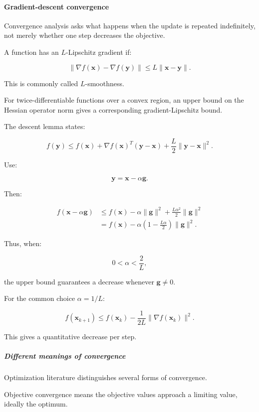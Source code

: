 \paragraph{Gradient-descent convergence}\label{gradient-descent-convergence}

Convergence analysis asks what happens when the update is repeated indefinitely, not merely whether one step decreases the objective.

A function has an \(L\)-Lipschitz gradient if:

\[
\|\nabla f(\mathbf x)-\nabla f(\mathbf y)\| \le L\|\mathbf x-\mathbf y\|.
\]

This is commonly called \(L\)-smoothness.

For twice-differentiable functions over a convex region, an upper bound on the Hessian operator norm gives a corresponding gradient-Lipschitz bound.

The descent lemma states:

\[
f(\mathbf y) \le f(\mathbf x)+ \nabla f(\mathbf x)^T(\mathbf y-\mathbf x) +\frac L2\|\mathbf y-\mathbf x\|^2.
\]

Use:

\[
\mathbf y=\mathbf x-\alpha\mathbf g.
\]

Then:

\[
\begin{aligned} f(\mathbf x-\alpha\mathbf g) &\le f(\mathbf x) -\alpha\|\mathbf g\|^2 +\frac{L\alpha^2}{2}\|\mathbf g\|^2\\ &=f(\mathbf x) -\alpha\left(1-\frac{L\alpha}{2}\right)\|\mathbf g\|^2. \end{aligned}
\]

Thus, when:

\[
0<\alpha<\frac2L,
\]

the upper bound guarantees a decrease whenever \(\mathbf g\ne0\).

For the common choice \(\alpha=1/L\):

\[
\boxed{ f(\mathbf x_{k+1}) \le f(\mathbf x_k)- \frac1{2L}\|\nabla f(\mathbf x_k)\|^2 }.
\]

This gives a quantitative decrease per step.

\subparagraph{Different meanings of convergence}\label{different-meanings-of-convergence}

Optimization literature distinguishes several forms of convergence.

Objective convergence means the objective values approach a limiting value, ideally the optimum.

